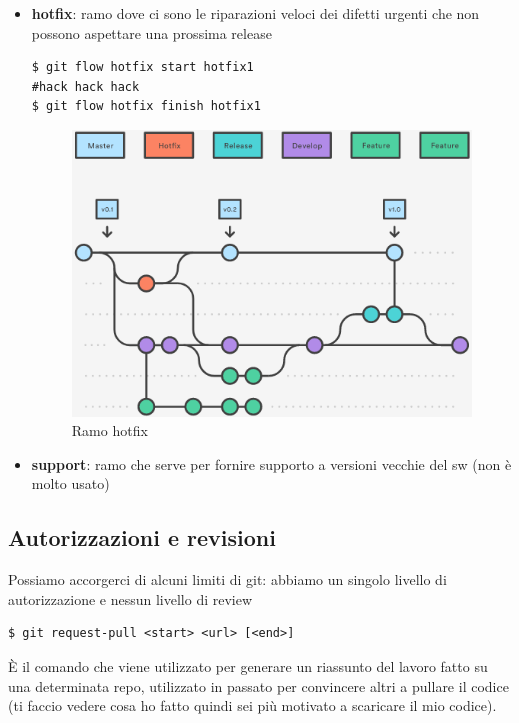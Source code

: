 \begin{itemize}
    \item \textbf{hotfix}: ramo dove ci sono le riparazioni veloci dei difetti urgenti che non possono aspettare una prossima release
    \begin{verbatim}
$ git flow hotfix start hotfix1
#hack hack hack
$ git flow hotfix finish hotfix1
    \end{verbatim}
    \begin{figure}[H]
    	\begin{center}
        	 \includegraphics[scale=0.55]{img/hotfix.png}
        	 \caption{Ramo hotfix}
     	\end{center}
    \end{figure}
    \item \textbf{support}: ramo che serve per fornire supporto a versioni vecchie del sw (non è molto usato)
\end{itemize}

\subsection{Autorizzazioni e revisioni}
Possiamo accorgerci di alcuni limiti di git: abbiamo un singolo livello di autorizzazione e nessun livello di review

\begin{verbatim}
$ git request-pull <start> <url> [<end>]
\end{verbatim}
È il comando che viene utilizzato per generare un riassunto del lavoro fatto su una determinata repo, utilizzato in passato per convincere altri a pullare il codice (ti faccio vedere cosa ho fatto quindi sei più motivato a scaricare il mio codice). \\\\

